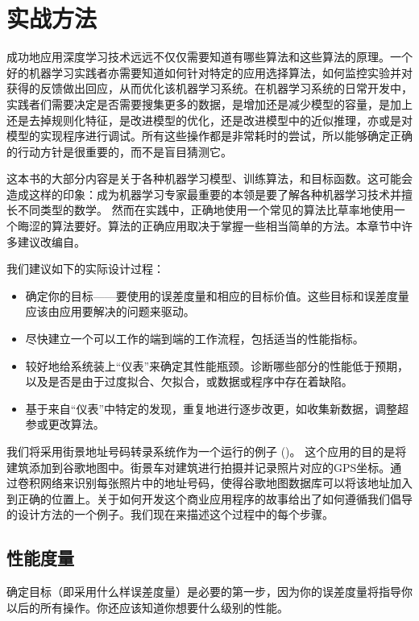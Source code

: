 \chapter{实战方法}
\label{chap:11}

成功地应用深度学习技术远远不仅仅需要知道有哪些算法和这些算法的原理。一个好的机器学习实践者亦需要知道如何针对特定的应用选择算法，如何监控实验并对获得的反馈做出回应，从而优化该机器学习系统。在机器学习系统的日常开发中，实践者们需要决定是否需要搜集更多的数据，是增加还是减少模型的容量，是加上还是去掉规则化特征，是改进模型的优化，还是改进模型中的近似推理，亦或是对模型的实现程序进行调试。所有这些操作都是非常耗时的尝试，所以能够确定正确的行动方针是很重要的，而不是盲目猜测它。

这本书的大部分内容是关于各种机器学习模型、训练算法，和目标函数。这可能会造成这样的印象：成为机器学习专家最重要的本领是要了解各种机器学习技术并擅长不同类型的数学。 然而在实践中，正确地使用一个常见的算法比草率地使用一个晦涩的算法要好。算法的正确应用取决于掌握一些相当简单的方法。本章节中许多建议改编自\cite{ng-lecture-advice}。

我们建议如下的实际设计过程：
\begin{itemize}
\item 确定你的目标——要使用的误差度量和相应的目标价值。这些目标和误差度量应该由应用要解决的问题来驱动。
\item 尽快建立一个可以工作的端到端的工作流程，包括适当的性能指标。
\item 较好地给系统装上“仪表”来确定其性能瓶颈。诊断哪些部分的性能低于预期，以及是否是由于过度拟合、欠拟合，或数据或程序中存在着缺陷。
\item 基于来自“仪表”中特定的发现，重复地进行逐步改更，如收集新数据，调整超参或更改算法。
\end{itemize}

我们将采用街景地址号码转录系统作为一个运行的例子 (\citep{Goodfellow+et+al-ICLR2014a})。 这个应用的目的是将建筑添加到谷歌地图中。街景车对建筑进行拍摄并记录照片对应的GPS坐标。通过卷积网络来识别每张照片中的地址号码，使得谷歌地图数据库可以将该地址加入到正确的位置上。关于如何开发这个商业应用程序的故事给出了如何遵循我们倡导的设计方法的一个例子。我们现在来描述这个过程中的每个步骤。

\section{性能度量}
\label{sec:11.1}
确定目标（即采用什么样误差度量）是必要的第一步，因为你的误差度量将指导你以后的所有操作。你还应该知道你想要什么级别的性能。

